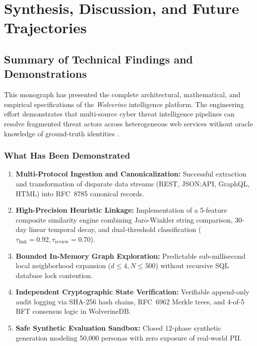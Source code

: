\chapter{Synthesis, Discussion, and Future Trajectories}
\label{ch:conclusion}

\section{Summary of Technical Findings and Demonstrations}
\label{sec:summary_findings}

This monograph has presented the complete architectural, mathematical, and empirical specifications of the \textit{Wolverine} intelligence platform. The engineering effort demonstrates that multi-source cyber threat intelligence pipelines can resolve fragmented threat actors across heterogeneous web services without oracle knowledge of ground-truth identities \cite{fellegi1969theory, liao2016acing}. 

\subsection{What Has Been Demonstrated}
\begin{enumerate}
    \item \textbf{Multi-Protocol Ingestion and Canonicalization:} Successful extraction and transformation of disparate data streams (REST, JSON:API, GraphQL, HTML) into RFC~8785 canonical records.
    \item \textbf{High-Precision Heuristic Linkage:} Implementation of a 5-feature composite similarity engine combining Jaro-Winkler string comparison, 30-day linear temporal decay, and dual-threshold classification ($\tau_{\text{link}} = 0.92, \tau_{\text{review}} = 0.70$).
    \item \textbf{Bounded In-Memory Graph Exploration:} Predictable sub-millisecond local neighborhood expansion ($d \le 4, N \le 500$) without recursive SQL database lock contention.
    \item \textbf{Independent Cryptographic State Verification:} Verifiable append-only audit logging via SHA-256 hash chains, RFC~6962 Merkle trees, and 4-of-5 BFT consensus logic in WolverineDB.
    \item \textbf{Safe Synthetic Evaluation Sandbox:} Closed 12-phase synthetic generation modeling 50,000 personas with zero exposure of real-world PII.
\end{enumerate}

